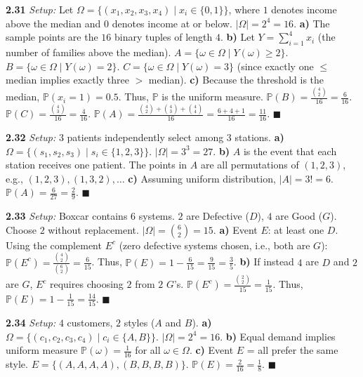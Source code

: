 \documentclass[11pt]{article}
\theoremstyle{definition}
\begin{document}
\textbf{2.31} 
\textit{Setup:} Let $\Omega = \{ (x_1, x_2, x_3, x_4) \mid x_i \in \{0, 1\} \}$, where $1$ denotes income above the median and $0$ denotes income at or below. $|\Omega| = 2^4 = 16$.
\textbf{a)} The sample points are the $16$ binary tuples of length $4$.
\textbf{b)} Let $Y = \sum_{i=1}^4 x_i$ (the number of families above the median).
$A = \{ \omega \in \Omega \mid Y(\omega) \geq 2 \}$.
$B = \{ \omega \in \Omega \mid Y(\omega) = 2 \}$.
$C = \{ \omega \in \Omega \mid Y(\omega) = 3 \}$ (since exactly one $\leq$ median implies exactly three $>$ median).
\textbf{c)} Because the threshold is the median, $\mathbb{P}(x_i=1) = 0.5$. Thus, $\mathbb{P}$ is the uniform measure.
$\mathbb{P}(B) = \frac{\binom{4}{2}}{16} = \frac{6}{16}$.
$\mathbb{P}(C) = \frac{\binom{4}{3}}{16} = \frac{4}{16}$.
$\mathbb{P}(A) = \frac{\binom{4}{2} + \binom{4}{3} + \binom{4}{4}}{16} = \frac{6 + 4 + 1}{16} = \frac{11}{16}$. $\blacksquare$

\textbf{2.32} 
\textit{Setup:} $3$ patients independently select among $3$ stations.
\textbf{a)} $\Omega = \{ (s_1, s_2, s_3) \mid s_i \in \{1, 2, 3\} \}$. $|\Omega| = 3^3 = 27$.
\textbf{b)} $A$ is the event that each station receives one patient. The points in $A$ are all permutations of $(1, 2, 3)$, e.g., $(1,2,3), (1,3,2), \dots$
\textbf{c)} Assuming uniform distribution, $|A| = 3! = 6$. $\mathbb{P}(A) = \frac{6}{27} = \frac{2}{9}$. $\blacksquare$

\textbf{2.33} 
\textit{Setup:} Boxcar contains $6$ systems. $2$ are Defective ($D$), $4$ are Good ($G$). Choose $2$ without replacement. $|\Omega| = \binom{6}{2} = 15$.
\textbf{a)} Event $E$: at least one $D$. Using the complement $E^c$ (zero defective systems chosen, i.e., both are $G$):
$\mathbb{P}(E^c) = \frac{\binom{4}{2}}{\binom{6}{2}} = \frac{6}{15}$. Thus, $\mathbb{P}(E) = 1 - \frac{6}{15} = \frac{9}{15} = \frac{3}{5}$.
\textbf{b)} If instead $4$ are $D$ and $2$ are $G$, $E^c$ requires choosing $2$ from $2$ $G$'s.
$\mathbb{P}(E^c) = \frac{\binom{2}{2}}{15} = \frac{1}{15}$. Thus, $\mathbb{P}(E) = 1 - \frac{1}{15} = \frac{14}{15}$. $\blacksquare$

\textbf{2.34} 
\textit{Setup:} $4$ customers, $2$ styles ($A$ and $B$).
\textbf{a)} $\Omega = \{ (c_1, c_2, c_3, c_4) \mid c_i \in \{A, B\} \}$. $|\Omega| = 2^4 = 16$.
\textbf{b)} Equal demand implies uniform measure $\mathbb{P}(\omega) = \frac{1}{16}$ for all $\omega \in \Omega$.
\textbf{c)} Event $E$ = all prefer the same style. $E = \{ (A,A,A,A), (B,B,B,B) \}$. $\mathbb{P}(E) = \frac{2}{16} = \frac{1}{8}$. $\blacksquare$
\end{document}
